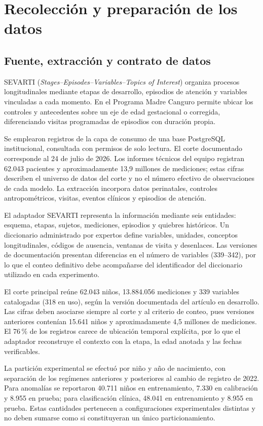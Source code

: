 \documentclass[conference,letterpaper]{IEEEtran}
\begin{document}
\section{Recolección y preparación de los datos}

\subsection{Fuente, extracción y contrato de datos}

SEVARTI (\textit{Stages--Episodes--Variables--Topics of Interest}) organiza procesos longitudinales mediante etapas de desarrollo, episodios de atención y variables vinculadas a cada momento. En el Programa Madre Canguro permite ubicar los controles y antecedentes sobre un eje de edad gestacional o corregida, diferenciando visitas programadas de episodios con duración propia.

Se emplearon registros de la capa de consumo de una base PostgreSQL institucional, consultada con permisos de solo lectura. El corte documentado corresponde al 24 de julio de 2026. Los informes técnicos del equipo registran 62.043 pacientes y aproximadamente 13,9 millones de mediciones; estas cifras describen el universo de datos del corte y no el número efectivo de observaciones de cada modelo. La extracción incorpora datos perinatales, controles antropométricos, visitas, eventos clínicos y episodios de atención.

El adaptador SEVARTI representa la información mediante seis entidades: esquema, etapas, sujetos, mediciones, episodios y quiebres históricos. Un diccionario administrado por expertos define variables, unidades, conceptos longitudinales, códigos de ausencia, ventanas de visita y desenlaces. Las versiones de documentación presentan diferencias en el número de variables (339--342), por lo que el conteo definitivo debe acompañarse del identificador del diccionario utilizado en cada experimento.

El corte principal reúne 62.043 niños, 13.884.056 mediciones y 339 variables catalogadas (318 en uso), según la versión documentada del artículo en desarrollo. Las cifras deben asociarse siempre al corte y al criterio de conteo, pues versiones anteriores contenían 15.641 niños y aproximadamente 4,5 millones de mediciones. El 76\,\% de los registros carece de ubicación temporal explícita, por lo que el adaptador reconstruye el contexto con la etapa, la edad anotada y las fechas verificables.

La partición experimental se efectuó por niño y año de nacimiento, con separación de los regímenes anteriores y posteriores al cambio de registro de 2022. Para anomalías se reportaron 40.711 niños en entrenamiento, 7.330 en calibración y 8.955 en prueba; para clasificación clínica, 48.041 en entrenamiento y 8.955 en prueba. Estas cantidades pertenecen a configuraciones experimentales distintas y no deben sumarse como si constituyeran un único particionamiento.
\end{document}
